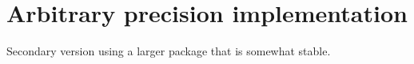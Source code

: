 \section{Arbitrary precision implementation}

Secondary version using a larger package that is somewhat stable.